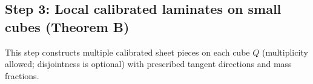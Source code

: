 \documentclass[11pt]{article}
\numberwithin{equation}{section}  %
\theoremstyle{plain}
\theoremstyle{definition}
\theoremstyle{remark}
\begin{document}
\subsection*{Step 3: Local calibrated laminates on small cubes (Theorem B)}

This step constructs multiple calibrated sheet pieces on each cube $Q$ (multiplicity allowed; disjointness is optional) with prescribed
 tangent directions and mass fractions.




\end{document}
